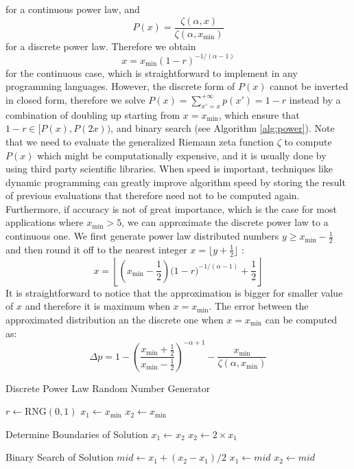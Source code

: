 for a continuous power law, and
\begin{equation}
P(x) = \frac{\zeta(\alpha,x)}{\zeta(\alpha,x_{\text{min}})}
\end{equation}
for a discrete power law. Therefore we obtain
\begin{equation}
x = x_{\text{min}}(1 - r)^{-1/(\alpha-1)}
\end{equation}
for the continuous case, which is straightforward to implement in any programming languages. However, the discrete form of $P(x)$ cannot be inverted in closed form, therefore we solve $P(x)=\sum_{x'=x}^{+\infty} p(x') = 1-r $ instead by a combination of doubling up starting from $x=x_{\text{min}}$, which ensure  that $1-r \in [P(x),P(2x))$, and binary search (see Algorithm \ref{alg:power}). Note that we need to evaluate the generalized Riemann zeta function $\zeta$ to compute $P(x)$ which might be computationally expensive, and it is usually done by using third party scientific libraries. When speed is important, techniques like dynamic programming can greatly improve algorithm speed by storing the result of previous evaluations that therefore need not to be computed again. Furthermore, if accuracy is not of great importance, which is the case for most applications where $x_{\text{min}} > 5$, we can approximate the discrete power law to a continuous one. We first generate power law distributed numbers $y \ge x_{\text{min}} - \frac{1}{2}$ and then round it off to the nearest integer $x = \big\lfloor y + \frac{1}{2} \big\rfloor$ \cite{clauset_2009_power}:
\begin{equation}
	x = \left\lfloor \left( x_{\text{min}} - \frac{1}{2} \right) \Bigg( 1 - r \Bigg)^{-1/(\alpha - 1)} + \frac{1}{2} \right\rfloor
\end{equation}
It is straightforward to notice that the approximation is bigger for smaller value of $x$ and therefore it is maximum when $x = x_{\text{min}}$. The error between the approximated distribution an the discrete one when $x = x_{\text{min}}$ can be computed as:
\begin{equation}
\Delta p = 1 - \left ( \frac{ x_{\text{min}} + \frac{1}{2}}{ x_{\text{min}} - \frac{1}{2}} \right)^{-\alpha+1} - \frac{x_{\text{min}}}{\zeta(\alpha,x_{\text{min}})}
\end{equation}
%
\begin{algorithm}
\caption{Discrete Power Law Random Number Generator}
\label{alg:power}
\begin{algorithmic}[1]
\State $r \gets \text{RNG}(0,1)$
\State $x_1 \gets x_{\text{min}}$
\State $x_2 \gets x_{\text{min}}$

\Repeat \Comment Determine Boundaries of Solution
	\State $x_1 \gets x_2$
	\State $x_2 \gets 2 \times x_1$

\Repeat \Comment Binary Search of Solution
	\State $mid \gets  x_1 +  (x_2 - x_1) / 2 $
		\State $x_1 \gets mid$
	\Else
		\State $x_2 \gets mid$
	\EndIf
{}
\State {}
\EndProcedure
\end{algorithmic}
\end{algorithm}
